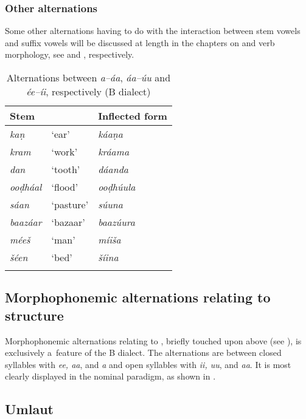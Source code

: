 \subsubsection*{Other alternations}

Some other alternations having to do with the interaction between stem vowels and suffix vowels will
be discussed at length in the chapters on  and verb morphology, see  and
, respectively.


\begin{table}[p]
\caption{Alternations between \textit{a--áa}, \textit{áa--úu} and \textit{ée--íi}, respectively (B dialect)}
\begin{tabularx}{\textwidth}{ Q Q Q }
\lsptoprule
Stem &
&
Inflected form\\\midrule
\textit{kaṇ} &
`ear' &
\textit{káaṇa} \\
\textit{kram} &
`work' &
\textit{kráama} \\
\textit{dan} &
`tooth' &
\textit{dáanda} \\
\textit{ooḍháal} &
`flood' &
\textit{ooḍhúula} \\
\textit{sáan} &
`pasture' &
\textit{súuna} \\
\textit{baazáar} &
`bazaar' &
\textit{baazúura} \\
\textit{méeš} &
`man' &
\textit{míiša} \\
\textit{šéen} &
`bed' &
\textit{šíina} \\\lspbottomrule
\end{tabularx}
\label{tab:3-15}
\end{table}
\clearpage
\subsection{Morphophonemic alternations relating to  structure}
\label{subsec:3-5-2}

Morphophonemic alternations relating to , briefly touched upon above (see ), is exclusively a~feature of the B dialect. The alternations are between closed syllables with \textit{ee, aa}, and \textit{a} and open syllables with \textit{ii, uu}, and \textit{aa}. It is most clearly displayed in the nominal paradigm, as shown in .





\subsection{Umlaut}
\label{subsec:3-5-3}


